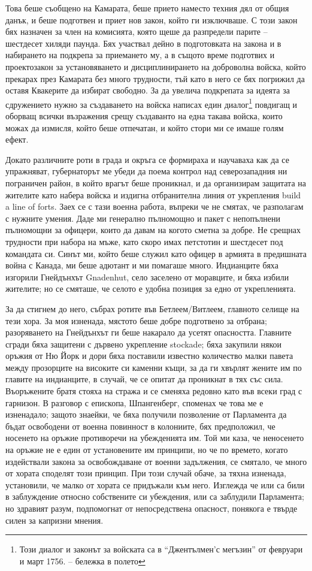 \documentclass[12pt]{book}
\begin{document}
Това беше съобщено на Камарата, беше прието наместо техния дял от общия данък, и беше подготвен и приет нов закон, който ги изключваше. С този закон бях назначен за член на комисията, която щеше да разпредели парите – шестдесет хиляди паунда. Бях участвал дейно в подготовката на закона и в набирането на подкрепа за приемането му, а в същото време подготвих и проектозакон за установяването и дисциплинирането на доброволна войска, който прекарах през Камарата без много трудности, тъй като в него се бях погрижил да оставя Квакерите да избират свободно. За да увелича подкрепата за идеята за сдружението нужно за създаването на войска написах един диалог\footnote{Този диалог и законът за войската са в “Джентълмен'с мегъзин” от февруари и март 1756. – бележка в полето} повдигащ и оборващ всички възражения срещу създаванто на една такава войска, които можах да измисля, който беше отпечатан, и който стори ми се имаше голям ефект. 

Докато различните роти в града и окръга се формираха и научаваха как да се упражняват, губернаторът ме убеди да поема контрол над северозападния ни пограничен район, в който врагът беше проникнал, и да организирам защитата на жителите като набера войска и издигна отбранителна линия от укрепления build a line of forts. Заех се с тази военна работа, въпреки че не смятах, че разполагам с нужните умения. Даде ми генерално пълномощно и пакет с непопълнени пълномощни за офицери, които да давам на когото сметна за добре. Не срещнах трудности при набора на мъже, като скоро имах петстотин и шестдесет под командата си. Синът ми, който беше служил като офицер в армията в предишната война с Канада, ми беше адютант и ми помагаше много. Индианците бяха изгорили Гнейдънхът Gnadenhut, село заселено от моравците, и бяха избили жителите; но се смяташе, че селото е удобна позиция за едно от укрепленията. 

За да стигнем до него, събрах ротите във Бетлеем/Витлеем, главното селище на тези хора. За моя изненада, мястото беше добре подготвено за отбрана; разоряването на Гнейдънхът ги беше накарало да усетят опасността. Главните сгради бяха защитени с дървено укрепление stockade; бяха закупили някои оръжия от Ню Йорк и дори бяха поставили известно количество малки павета между прозорците на високите си каменни къщи, за да ги хвърлят жените им по главите на индианците, в случай, че се опитат да проникнат в тях със сила. Въоръжените братя стояха на стража и се сменяха редовно като във всеки град с гарнизон. В разговор с епископа, Шпангенберг, споменах че това ме е изненадало; защото знаейки, че бяха получили позволение от Парламента да бъдат освободени от военна повинност в колониите, бях предположил, че носенето на оръжие противоречи на убежденията им. Той ми каза, че неносенето на оръжие не е един от установените им принципи, но че по времето, когато издействали закона за освобождаване от военни задължения, се смятало, че много от хората споделят този принцип. При този случай обаче, за тяхна изненада, установили, че малко от хората се придъжали към него. Изглежда че или са били в заблуждение относно собствените си убеждения, или са заблудили Парламента; но здравият разум, подпомогнат от непосредствена опасност, понякога е твърде силен за капризни мнения.
\end{document}
